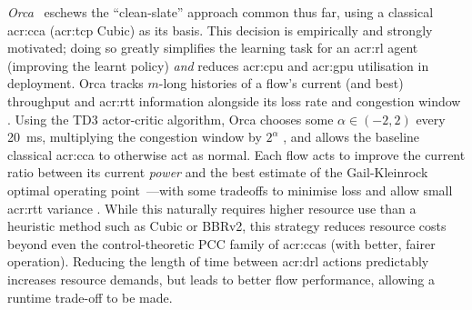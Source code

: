 \emph{Orca}~\parencite{DBLP:conf/sigcomm/AbbaslooYC20} eschews the ``clean-slate'' approach common thus far, using a classical \gls{acr:cca} (\gls{acr:tcp} Cubic) as its basis.
This decision is empirically and strongly motivated; doing so greatly simplifies the learning task for an \gls{acr:rl} agent (improving the learnt policy) \emph{and} reduces \gls{acr:cpu} and \gls{acr:gpu} utilisation in deployment.
Orca tracks $m$-long histories of a flow's current (and best) throughput and \gls{acr:rtt} information alongside its loss rate and congestion window \prllitstate.
Using the TD3 actor-critic algorithm, Orca chooses some $\alpha\in\left(-2, 2\right)$ every \qty{20}{\milli\second}, multiplying the congestion window by $2^\alpha$ \prllitactreal, and allows the baseline classical \gls{acr:cca} to otherwise act as normal.
Each flow acts to improve the current ratio between its current \emph{power} and the best estimate of the Gail-Kleinrock optimal operating point~\parencite{KleinrockPoint1,KleinrockPoint2}---with some tradeoffs to minimise loss and allow small \gls{acr:rtt} variance \prllitreward.
While this naturally requires higher resource use than a heuristic method such as Cubic or BBRv2, this strategy reduces resource costs beyond even the control-theoretic PCC family of \glspl{acr:cca} (with better, fairer operation).
Reducing the length of time between \gls{acr:drl} actions predictably increases resource demands, but leads to better flow performance, allowing a runtime trade-off to be made.

